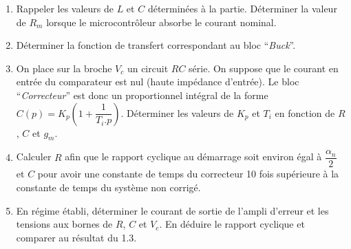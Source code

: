 \begin{enumerate}
\begin{enumerate}
\item Rappeler les valeurs de $L$ et $C$ déterminées à la partie. Déterminer la valeur de $R_m$ lorsque le microcontrôleur absorbe le courant nominal.

\item Déterminer la fonction de transfert correspondant au bloc ``\textit{Buck}''.

\item On place sur la broche $V_c$ un circuit $RC$ série. On suppose que le courant en entrée du comparateur est nul (haute impédance d'entrée). Le bloc ``\textit{Correcteur}'' est donc un proportionnel intégral de la forme $C(p) = K_p(1+\dfrac{1}{T_i.p})$. Déterminer les valeurs de $K_p$ et $T_i$ en fonction de $R$, $C$ et $g_m$.

\item Calculer $R$ afin que le rapport cyclique au démarrage soit environ égal à $\dfrac{\alpha_n}{2}$ et $C$ pour avoir une constante de temps du correcteur 10 fois supérieure à la constante de temps du système non corrigé.

\item En régime établi, déterminer le courant de sortie de l'ampli d'erreur et les tensions aux bornes de $R$, $C$ et $V_c$. En déduire le rapport cyclique et comparer au résultat du 1.3.


\end{enumerate}

\end{enumerate}

\newpage

